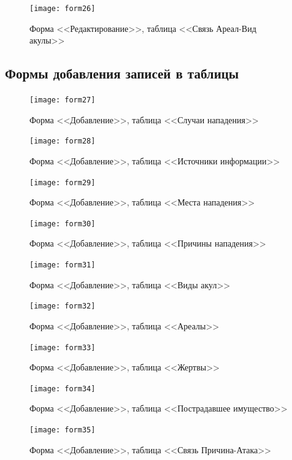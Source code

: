 \documentclass[russian,utf8,simple,emptystyle]{eskdtext}
\begin{document}
\begin{figure}[ht]
\centering
\texttt{[image: form26]}
\caption{Форма <<Редактирование>>, таблица <<Связь Ареал-Вид акулы>>}
\end{figure}

\clearpage
\subsection{Формы добавления записей в таблицы}
\begin{figure}[ht]
\centering
\texttt{[image: form27]}
\caption{Форма <<Добавление>>, таблица <<Случаи нападения>>}
\end{figure}

\begin{figure}[hb]
\centering
\texttt{[image: form28]}
\caption{Форма <<Добавление>>, таблица <<Источники информации>>}
\end{figure}

\begin{figure}[ht]
\centering
\texttt{[image: form29]}
\caption{Форма <<Добавление>>, таблица <<Места нападения>>}
\end{figure}

\begin{figure}[hb]
\centering
\texttt{[image: form30]}
\caption{Форма <<Добавление>>, таблица <<Причины нападения>>}
\end{figure}

\begin{figure}[ht]
\centering
\texttt{[image: form31]}
\caption{Форма <<Добавление>>, таблица <<Виды акул>>}
\end{figure}

\begin{figure}[hb]
\centering
\texttt{[image: form32]}
\caption{Форма <<Добавление>>, таблица <<Ареалы>>}
\end{figure}

\begin{figure}[ht]
\centering
\texttt{[image: form33]}
\caption{Форма <<Добавление>>, таблица <<Жертвы>>}
\end{figure}

\begin{figure}[hb]
\centering
\texttt{[image: form34]}
\caption{Форма <<Добавление>>, таблица <<Пострадавшее имущество>>}
\end{figure}

\begin{figure}[ht]
\centering
\texttt{[image: form35]}
\caption{Форма <<Добавление>>, таблица <<Связь Причина-Атака>>}
\end{figure}
\end{document}
